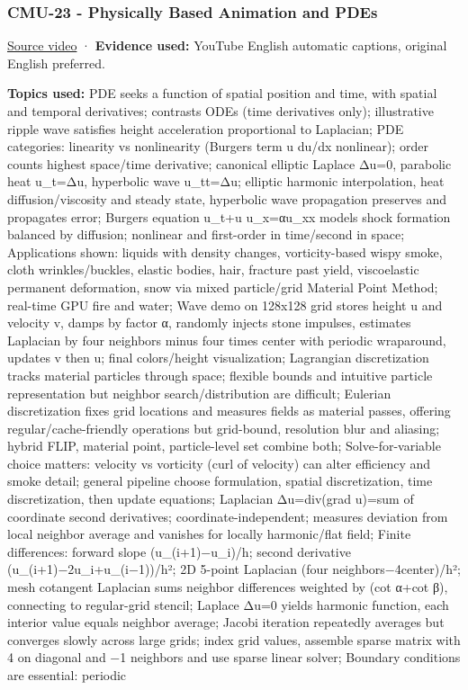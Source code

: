 \subsubsection{CMU-23 - Physically Based Animation and PDEs}\label{04-visual-computing-ii-ch036-cmu-23---physically-based-animation-and-pdes}

\hypertarget{04-visual-computing-ii-ch036-cmu-23---physically-based-animation-and-pdes}{}

\href{https://www.youtube.com/watch?v=gqdXsw_Q_as}{Source video} · \textbf{Evidence used:} YouTube English automatic captions, original English preferred.

\textbf{Topics used:} PDE seeks a function of spatial position and time, with spatial and temporal derivatives; contrasts ODEs (time derivatives only); illustrative ripple wave satisfies height acceleration proportional to Laplacian; PDE categories: linearity vs nonlinearity (Burgers term u du/dx nonlinear); order counts highest space/time derivative; canonical elliptic Laplace Δu=0, parabolic heat u\_t=Δu, hyperbolic wave u\_tt=Δu; elliptic harmonic interpolation, heat diffusion/viscosity and steady state, hyperbolic wave propagation preserves and propagates error; Burgers equation u\_t+u u\_x=αu\_xx models shock formation balanced by diffusion; nonlinear and first-order in time/second in space; Applications shown: liquids with density changes, vorticity-based wispy smoke, cloth wrinkles/buckles, elastic bodies, hair, fracture past yield, viscoelastic permanent deformation, snow via mixed particle/grid Material Point Method; real-time GPU fire and water; Wave demo on 128x128 grid stores height u and velocity v, damps by factor α, randomly injects stone impulses, estimates Laplacian by four neighbors minus four times center with periodic wraparound, updates v then u; final colors/height visualization; Lagrangian discretization tracks material particles through space; flexible bounds and intuitive particle representation but neighbor search/distribution are difficult; Eulerian discretization fixes grid locations and measures fields as material passes, offering regular/cache-friendly operations but grid-bound, resolution blur and aliasing; hybrid FLIP, material point, particle-level set combine both; Solve-for-variable choice matters: velocity vs vorticity (curl of velocity) can alter efficiency and smoke detail; general pipeline choose formulation, spatial discretization, time discretization, then update equations; Laplacian Δu=div(grad u)=sum of coordinate second derivatives; coordinate-independent; measures deviation from local neighbor average and vanishes for locally harmonic/flat field; Finite differences: forward slope (u\_(i+1)−u\_i)/h; second derivative (u\_(i+1)−2u\_i+u\_(i−1))/h²; 2D 5-point Laplacian (four neighbors−4center)/h²; mesh cotangent Laplacian sums neighbor differences weighted by (cot α+cot β), connecting to regular-grid stencil; Laplace Δu=0 yields harmonic function, each interior value equals neighbor average; Jacobi iteration repeatedly averages but converges slowly across large grids; index grid values, assemble sparse matrix with 4 on diagonal and −1 neighbors and use sparse linear solver; Boundary conditions are essential: periodic 